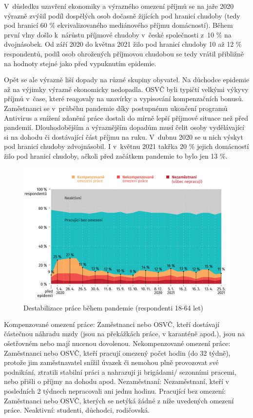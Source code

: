 V důsledku uzavření ekonomiky a výrazného omezení příjmů se na jaře 2020 výrazně zvýšil podíl dospělých osob dočasně žijících pod hranicí chudoby (tedy pod hranicí 60 \% ekvivalizovaného mediánového příjmu domácností). Během první vlny došlo k nárůstu
příjmové chudoby v české společnosti z 10 \% na dvojnásobek. Od září 2020 do května 2021 žilo pod hranicí chudoby 10 až 12 \% respondentů, podíl osob ohrožených příjmovou chudobou se tedy vrátil přibližně na hodnoty stejné jako před vypuknutím epidemie.

Opět se ale výrazně liší dopady na různé skupiny obyvatel. Na důchodce epidemie až na výjimky výrazně ekonomicky nedopadla. OSVČ byli typičtí velkými výkyvy příjmů v čase, které reagovaly na uzavírky a vypisování kompenzačních bonusů. Zaměstnanci se v průběhu pandemie díky postupnému ukončení programů Antivirus a snížení zdanění práce dostali do mírně lepší příjmové situace než před pandemií. Dlouhodobějším a výraznějším dopadům musí čelit osoby vydělávající si na dohodu či dostávající část příjmu na ruku. V dubnu 2020 se u nich výskyt pod hranicí chudoby zdvojnásobil. I v květnu 2021 takřka 20 \% jejich domácností žilo pod hranicí chudoby, ačkoli před začátkem pandemie to bylo jen 13 \%.


\begin{figure}[ht]
    \centering
    \includegraphics[width=\textwidth]{./pic/zbp-graf1.png}
    \caption{Destabilizace práce během pandemie (respondenti 18-64 let)}
    \label{fig:zbp1}
\end{figure}

Kompenzované omezení práce: Zaměstnanci nebo OSVČ, kteří dostávají částečnou náhradu mzdy (jsou na překážkách práce, v karanténě apod.), jsou na ošetřovném nebo mají nucenou dovolenou. Nekompenzované omezení práce: Zaměstnanci nebo OSVČ, kteří pracují omezený počet hodin (do 32 týdně), protože jim zaměstnavatel snížil úvazek či nemohou plně provozovat své podnikání, ztratili stabilní práci a nahrazují ji brigádami/ sezonními pracemi, nebo přišli o příjmy na dohodu apod. Nezaměstnaní: Nezaměstnaní, kteří v posledních 2 týdnech nepracovali ani jednu hodinu. Pracující bez omezení: Zaměstnanci nebo OSVČ, kterých se netýká žádné z níže uvedených omezení práce. Neaktivní: studenti, důchodci, rodičovská.

